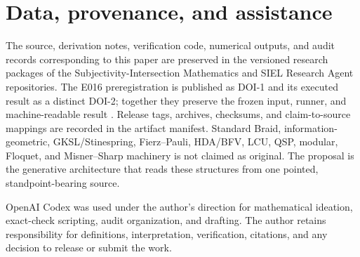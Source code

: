 \documentclass[11pt]{article}
\theoremstyle{definition}
\theoremstyle{remark}
\begin{document}
\section{Data, provenance, and assistance}

The source, derivation notes, verification code, numerical outputs, and audit records corresponding to this paper are preserved in the versioned research packages of the Subjectivity-Intersection Mathematics and SIEL Research Agent repositories. The E016 preregistration is published as DOI-1 and its executed result as a distinct DOI-2; together they preserve the frozen input, runner, and machine-readable result \cite{e016prereg,e016result}. Release tags, archives, checksums, and claim-to-source mappings are recorded in the artifact manifest. Standard Braid, information-geometric, GKSL/Stinespring, Fierz--Pauli, HDA/BFV, LCU, QSP, modular, Floquet, and Misner--Sharp machinery is not claimed as original. The proposal is the generative architecture that reads these structures from one pointed, standpoint-bearing source.

OpenAI Codex was used under the author's direction for mathematical ideation, exact-check scripting, audit organization, and drafting. The author retains responsibility for definitions, interpretation, verification, citations, and any decision to release or submit the work.
\end{document}
